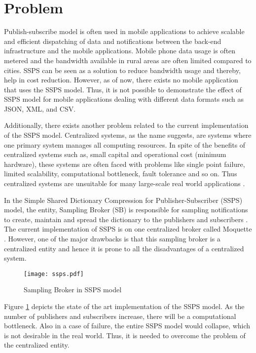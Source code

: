 \section{Problem}

Publish-subscribe model is often used in mobile applications to achieve scalable and efficient dispatching of data and notifications between the back-end infrastructure and the mobile applications. Mobile phone data usage is often metered and the bandwidth available in rural areas are often limited compared to cities. SSPS can be seen as a solution to reduce bandwidth usage and thereby, help in cost reduction. However, as of now, there exists no mobile application that uses the SSPS model. Thus, it is not possible to demonstrate the effect of SSPS model for mobile applications dealing with different data formats such as JSON, XML, and CSV.

Additionally, there exists another problem related to the current implementation of the SSPS model. Centralized systems, as the name suggests, are systems where one primary system manages all computing resources. In spite of the benefits of centralized systems such as, small capital and operational cost (minimum hardware), these systems are often faced with problems like single point failure, limited scalability, computational bottleneck, fault tolerance and so on. Thus centralized systems are unsuitable for many large-scale real world applications \parencite{tanenbaum2007distributed}.

In the Simple Shared Dictionary Compression for Publisher-Subscriber (SSPS) model, the entity, Sampling Broker (SB) is responsible for sampling notifications to create, maintain and spread the dictionary to the publishers and subscribers \parencite{Doblander:2016:SDC}. The current implementation of SSPS is on one centralized broker called Moquette \parencite{moquette}. However, one of the major drawbacks is that this sampling broker is a centralized entity and hence it is prone to all the disadvantages of a centralized system.

\makeatletter
\setlength{\@fptop}{0pt}
\makeatother

\begin{figure}[t!]
\centering
\texttt{[image: ssps.pdf]}
\caption{Sampling Broker in SSPS model}\label{figures:ssps}
\end{figure}

Figure \ref{figures:ssps} depicts the state of the art implementation of the SSPS model. As the number of publishers and subscribers increase, there will be a computational bottleneck. Also in a case of failure, the entire SSPS model would collapse, which is not desirable in the real world. Thus, it is needed to overcome the problem of the centralized entity.